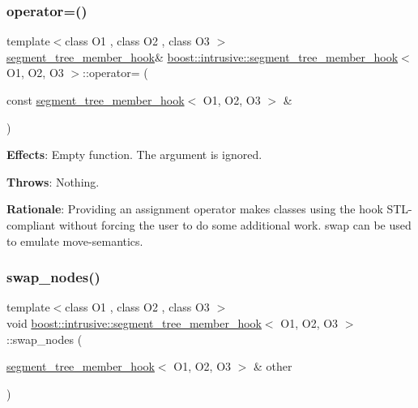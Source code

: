 \subsubsection{\texorpdfstring{operator=()}{operator=()}}
{\footnotesize\ttfamily template$<$class O1 , class O2 , class O3 $>$ \\
\hyperlink{classboost_1_1intrusive_1_1segment__tree__member__hook}{segment\+\_\+tree\+\_\+member\+\_\+hook}\& \hyperlink{classboost_1_1intrusive_1_1segment__tree__member__hook}{boost\+::intrusive\+::segment\+\_\+tree\+\_\+member\+\_\+hook}$<$ O1, O2, O3 $>$\+::operator= (\begin{DoxyParamCaption}\item[{const \hyperlink{classboost_1_1intrusive_1_1segment__tree__member__hook}{segment\+\_\+tree\+\_\+member\+\_\+hook}$<$ O1, O2, O3 $>$ \&}]{ }\end{DoxyParamCaption})}

{\bfseries Effects}\+: Empty function. The argument is ignored.

{\bfseries Throws}\+: Nothing.

{\bfseries Rationale}\+: Providing an assignment operator makes classes using the hook S\+T\+L-\/compliant without forcing the user to do some additional work. {\ttfamily swap} can be used to emulate move-\/semantics. \mbox{\label{classboost_1_1intrusive_1_1segment__tree__member__hook_a53f587840e009b7bee437e1be531b428}} 
\subsubsection{\texorpdfstring{swap\+\_\+nodes()}{swap\_nodes()}}
{\footnotesize\ttfamily template$<$class O1 , class O2 , class O3 $>$ \\
void \hyperlink{classboost_1_1intrusive_1_1segment__tree__member__hook}{boost\+::intrusive\+::segment\+\_\+tree\+\_\+member\+\_\+hook}$<$ O1, O2, O3 $>$\+::swap\+\_\+nodes (\begin{DoxyParamCaption}\item[{\hyperlink{classboost_1_1intrusive_1_1segment__tree__member__hook}{segment\+\_\+tree\+\_\+member\+\_\+hook}$<$ O1, O2, O3 $>$ \&}]{other }\end{DoxyParamCaption})}

